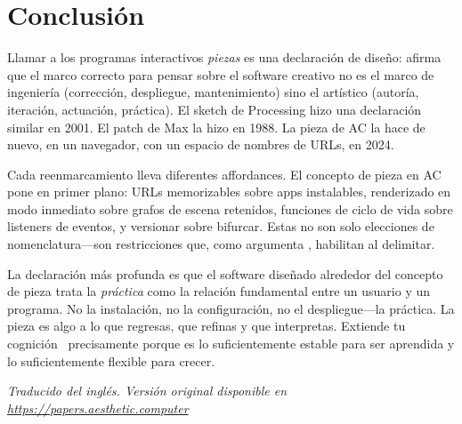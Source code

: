 \documentclass[10pt,letterpaper,twocolumn]{article}
\begin{document}
\section{Conclusión}

Llamar a los programas interactivos \emph{piezas} es una declaración de diseño: afirma que el marco correcto para pensar sobre el software creativo no es el marco de ingeniería (corrección, despliegue, mantenimiento) sino el artístico (autoría, iteración, actuación, práctica). El sketch de Processing hizo una declaración similar en 2001. El patch de Max la hizo en 1988. La pieza de AC la hace de nuevo, en un navegador, con un espacio de nombres de URLs, en 2024.

Cada reenmarcamiento lleva diferentes affordances. El concepto de pieza en AC pone en primer plano: URLs memorizables sobre apps instalables, renderizado en modo inmediato sobre grafos de escena retenidos, funciones de ciclo de vida sobre listeners de eventos, y versionar sobre bifurcar. Estas no son solo elecciones de nomenclatura---son restricciones que, como argumenta \citet{magnusson2010designing}, habilitan al delimitar.

La declaración más profunda es que el software diseñado alrededor del concepto de pieza trata la \emph{práctica} como la relación fundamental entre un usuario y un programa. No la instalación, no la configuración, no el despliegue---la práctica. La pieza es algo a lo que regresas, que refinas y que interpretas. Extiende tu cognición~\citep{clark1998extended} precisamente porque es lo suficientemente estable para ser aprendida y lo suficientemente flexible para crecer.

\vspace{0.5em}
\noindent\textit{Traducido del inglés. Versión original disponible en \url{https://papers.aesthetic.computer}}



\end{document}
